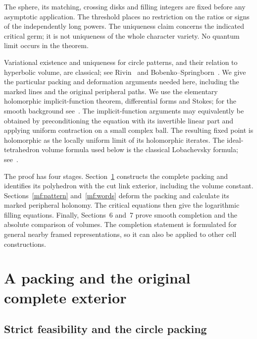 \documentclass[11pt]{article}
\numberwithin{equation}{section}
\theoremstyle{definition}
\theoremstyle{remark}
\begin{document}
The sphere, its matching, crossing disks and filling integers are fixed before
any asymptotic application. The threshold places no restriction on the
ratios or signs of the independently long powers. The uniqueness claim
concerns the indicated critical germ; it is not uniqueness of the whole
character variety. No quantum limit occurs in the theorem.

Variational existence and uniqueness for circle patterns, and their
relation to hyperbolic volume, are classical;
see Rivin~\cite{Rivin} and Bobenko--Springborn~\cite{BobenkoSpringborn}.
We give the particular
packing and deformation arguments needed here, including the marked
lines and the original peripheral paths. We use the elementary
holomorphic implicit-function theorem, differential forms and Stokes;
for the smooth background see~\cite[Chapters 4 and 16]{Lee}.
The implicit-function arguments may equivalently be obtained by
preconditioning the equation with its invertible linear part and
applying uniform contraction on a small complex ball. The resulting
fixed point is holomorphic as the locally uniform limit of its
holomorphic iterates.
The ideal-tetrahedron volume formula used below is the classical
Lobachevsky formula; see~\cite[Appendix]{Milnor}.

The proof has four stages. Section~\ref{mf:topology} constructs the
complete packing and identifies its polyhedron with the cut link
exterior, including the volume constant. Sections~\ref{mf:pattern}
and~\ref{mf:words} deform the packing and calculate its marked
peripheral holonomy. The critical equations then give the logarithmic
filling equations. Finally, Sections~6 and~7 prove smooth completion
and the absolute comparison of volumes. The completion statement is
formulated for general nearby framed representations, so it can also
be applied to other cell constructions.

\section{A packing and the original complete exterior}\label{mf:topology}

\subsection{Strict feasibility and the circle packing}
\end{document}
